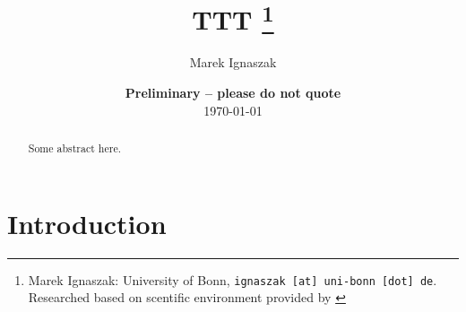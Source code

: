 \documentclass[11pt, a4paper, fleqn]{article}
\begin{document}
\title{TTT
\thanks{Marek Ignaszak: University of Bonn, {\nolinkurl{ignaszak [at] uni-bonn [dot] de}}. Researched based on scentific environment provided by \cite{GaudeckerEconProjectTemplates}}
}

\author{Marek Ignaszak
}

\date{
{\bf Preliminary -- please do not quote}
\\[1ex]
\today
}

\maketitle


\begin{abstract}
	Some abstract here.
\end{abstract}
\clearpage

\section{Introduction} %
\label{sec:introduction}



\printbibliography
{}
\end{document}
